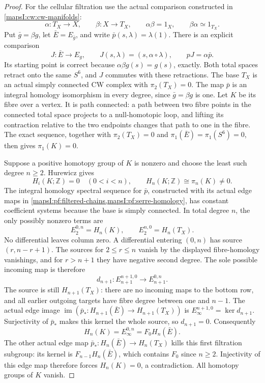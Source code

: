 \documentclass[11pt]{article}
\begin{document}
\begin{proof}
For the cellular filtration use the actual comparison constructed in
\cref{mapsI:cw:cw-manifolds}:
\[
 \alpha:T_X\longrightarrow X,\qquad
 \beta:X\longrightarrow T_X,\qquad
 \alpha\beta=1_X,\qquad \beta\alpha\simeq1_{T_X}.
\]
Put \(\bar g=\beta g\), let \(\bar E=E_{\bar g}\), and write
\(\bar p(s,\lambda)=\lambda(1)\).  There is an explicit comparison
\[
 J:\bar E\longrightarrow E_g,\qquad
 J(s,\lambda)=(s,\alpha\circ\lambda),
 \qquad pJ=\alpha\bar p.
\]
Its starting point is correct because
\(\alpha\beta g(s)=g(s)\), exactly.  Both total spaces retract onto the
same \(S^6\), and \(J\) commutes with these retractions.  The base
\(T_X\) is an actual simply connected CW complex with \(\pi_2(T_X)=0\).
The map \(\bar p\) is an integral homology isomorphism in every degree,
since \(\bar g=\beta g\) is one.  Let \(K\) be its fibre over a vertex.
It is path connected: a path between two fibre points in the connected
total space projects to a null-homotopic loop, and lifting its contraction
relative to the two endpoints changes that path to one in the fibre.
The exact sequence, together with \(\pi_2(T_X)=0\) and
\(\pi_1(\bar E)=\pi_1(S^6)=0\), then gives \(\pi_1(K)=0\).

Suppose a positive homotopy group of \(K\) is nonzero and choose the least
such degree \(n\ge2\).  Hurewicz gives
\[
 H_i(K;\mathbb Z)=0\quad(0<i<n),\qquad
 H_n(K;\mathbb Z)\cong\pi_n(K)\ne0.
\]
The integral homology spectral sequence for \(\bar p\), constructed
with its actual edge maps in \cref{mapsI:pf:filtered-chains,mapsI:pf:serre-homology},
has constant coefficient systems because the base is simply connected.
In total degree \(n\), the only possibly nonzero terms are
\[
 E_2^{0,n}=H_n(K),\qquad E_2^{n,0}=H_n(T_X).
\]
No differential leaves column zero.  A differential entering \((0,n)\)
has source \((r,n-r+1)\).  The sources for \(2\le r\le n\) vanish by
the displayed fibre-homology vanishings, and for \(r>n+1\) they have
negative second degree.  The sole possible incoming map is therefore
\[
 d_{n+1}:E_{n+1}^{n+1,0}\longrightarrow E_{n+1}^{0,n}.
\]
The source is still \(H_{n+1}(T_X)\): there are no incoming maps to
the bottom row, and all earlier outgoing targets have fibre degree
between one and \(n-1\).  The actual edge image
\(\operatorname{im}(\bar p_*:H_{n+1}(\bar E)\to H_{n+1}(T_X))\)
is \(E_\infty^{n+1,0}=\ker d_{n+1}\).  Surjectivity of \(\bar p_*\)
makes this kernel the whole source, so \(d_{n+1}=0\).
Consequently
\[
 H_n(K)=E_\infty^{0,n}=F_0H_n(\bar E).
\]
The other actual edge map \(\bar p_*:H_n(\bar E)\to H_n(T_X)\)
kills this first filtration subgroup: its kernel is
\(F_{n-1}H_n(\bar E)\), which contains \(F_0\) since \(n\ge2\).
Injectivity of this edge map therefore forces \(H_n(K)=0\), a
contradiction.  All homotopy groups of \(K\) vanish.


\end{proof}
\end{document}
